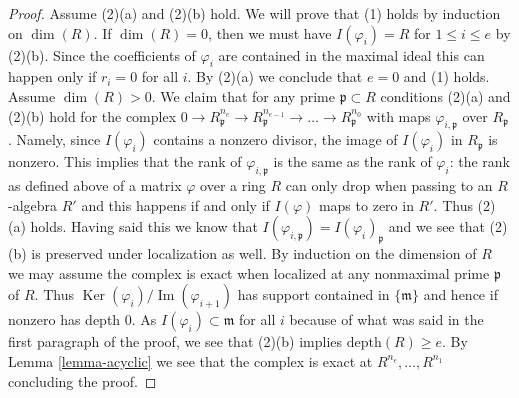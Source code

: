 \documentclass{amsart}
\theoremstyle{plain}
\theoremstyle{definition}
\theoremstyle{remark}
\numberwithin{equation}{subsection}
\def\Ker{\mathop{\mathrm{Ker}}}
\def\Im{\mathop{\mathrm{Im}}}
\begin{document}
\begin{proof}
\medskip\noindent
Assume (2)(a) and (2)(b) hold. We will prove that (1) holds by
induction on $\dim(R)$. If $\dim(R) = 0$, then we must have
$I(\varphi_i) = R$ for $1 \leq i \leq e$ by (2)(b). Since the
coefficients of $\varphi_i$ are contained in the maximal ideal
this can happen only if $r_i = 0$ for all $i$. By (2)(a) we
conclude that $e = 0$ and (1) holds. Assume $\dim(R) > 0$.
We claim that for any prime $\mathfrak p \subset R$ conditions
(2)(a) and (2)(b) hold for the complex
$0 \to R_\mathfrak p^{n_e} \to R_\mathfrak p^{n_{e - 1}} \to \ldots \to
R_\mathfrak p^{n_0}$ with maps $\varphi_{i, \mathfrak p}$
over $R_\mathfrak p$. Namely, since $I(\varphi_i)$ contains a
nonzero divisor, the image of $I(\varphi_i)$ in $R_\mathfrak p$
is nonzero. This implies that the rank of $\varphi_{i, \mathfrak p}$
is the same as the rank of $\varphi_i$: the rank as defined above
of a matrix $\varphi$ over a ring $R$ can only drop when passing
to an $R$-algebra $R'$ and this happens if and only if $I(\varphi)$
maps to zero in $R'$. Thus (2)(a) holds. Having said this
we know that $I(\varphi_{i, \mathfrak p}) = I(\varphi_i)_\mathfrak p$
and we see that (2)(b) is preserved under localization as well.
By induction on the dimension of $R$ we may assume the complex
is exact when localized at any nonmaximal prime $\mathfrak p$ of $R$.
Thus $\Ker(\varphi_i)/\Im(\varphi_{i + 1})$ has support contained in
$\{\mathfrak m\}$ and hence if nonzero has depth $0$.
As $I(\varphi_i) \subset \mathfrak m$ for all $i$ because
of what was said in the first paragraph of the proof, we
see that (2)(b) implies $\text{depth}(R) \geq e$.
By Lemma \ref{lemma-acyclic} we see
that the complex is exact at $R^{n_e}, \ldots, R^{n_1}$
concluding the proof.
\end{proof}
\end{document}
